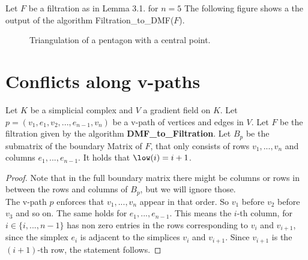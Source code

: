 Let $F$ be a filtration as in Lemma 3.1. for $n = 5$ The following figure shows a the output of the algorithm Filtration\_to\_DMF($F$).

\begin{figure}[H]
\noindent%
\centering%
%
\caption{Triangulation of a pentagon with a central point.}
\label{fig:pentagon_quad_morse}
\end{figure}


\section{Conflicts along v-paths}
\begin{lemma}
Let $K$ be a simplicial complex and $V$ a gradient field on $K$. Let $p = (v_1,e_1,v_2,...,e_{n-1},v_n)$ be a v-path of vertices and edges in $V$. Let $F$ be the filtration given by the algorithm \textbf{DMF\_to\_Filtration}. Let $B_p$ be the submatrix of the boundary Matrix of $F$, that only consists of rows $v_1,...,v_n$ and columns $e_1,...,e_{n-1}$. It holds that $\low(i) = i+1$.
\end{lemma}

\begin{proof}
Note that in the full boundary matrix there might be columns or rows in between the rows and columns of $B_p$, but we will ignore those. \\
The v-path $p$ enforces that $v_1,...,v_n$ appear in that order. So $v_1$ before $v_2$ before $v_3$ and so on. The same holds for $e_1,...,e_{n-1}$. This means the $i$-th column, for $i \in \{i,...,n-1\}$ has non zero entries in the rows corresponding to $v_i$ and $v_{i+1}$, since the simplex $e_i$ is adjacent to the simplices $v_i$ and $v_{i+1}$. Since $v_{i+1}$ is the $(i+1)$-th row, the statement follows.
\end{proof}

